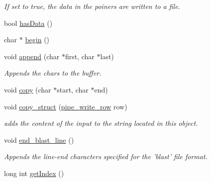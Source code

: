 \begin{DoxyCompactItemize}
\begin{DoxyCompactList}\small\item\em If set to true, the data in the poiners are written to a file. \end{DoxyCompactList}\item 
bool \hyperlink{classpipe__write__row_ab4f03f6fbd3c95567d43f5c170716a31}{hasData} ()
\item 
char $\ast$ \hyperlink{classpipe__write__row_aefc4cc6d2b93b89d8977a278fffe1204}{begin} ()
\item 
\hypertarget{classpipe__write__row_a4c65d2d25a7ce96fded64c1d74be2ce5}{
void \hyperlink{classpipe__write__row_a4c65d2d25a7ce96fded64c1d74be2ce5}{append} (char $\ast$first, char $\ast$last)}
\label{classpipe__write__row_a4c65d2d25a7ce96fded64c1d74be2ce5}

\begin{DoxyCompactList}\small\item\em Appends the chars to the buffer. \end{DoxyCompactList}\item 
void \hyperlink{classpipe__write__row_aab2549715725f68ec74e1ba5070c3fa7}{copy} (char $\ast$start, char $\ast$end)
\item 
\hypertarget{classpipe__write__row_adb2169a7991280908ea3bb1a4accdc82}{
void \hyperlink{classpipe__write__row_adb2169a7991280908ea3bb1a4accdc82}{copy\_\-struct} (\hyperlink{classpipe__write__row}{pipe\_\-write\_\-row} row)}
\label{classpipe__write__row_adb2169a7991280908ea3bb1a4accdc82}

\begin{DoxyCompactList}\small\item\em adds the content of the input to the string located in this object. \end{DoxyCompactList}\item 
\hypertarget{classpipe__write__row_af8627cdcd7884319a57a898a59404586}{
void \hyperlink{classpipe__write__row_af8627cdcd7884319a57a898a59404586}{end\_\-blast\_\-line} ()}
\label{classpipe__write__row_af8627cdcd7884319a57a898a59404586}

\begin{DoxyCompactList}\small\item\em Appends the line-\/end characters specified for the 'blast' file format. \end{DoxyCompactList}\item 
\hypertarget{classpipe__write__row_a91f2a5b891309c7a6a902945f4990486}{
long int \hyperlink{classpipe__write__row_a91f2a5b891309c7a6a902945f4990486}{getIndex} ()}
\label{classpipe__write__row_a91f2a5b891309c7a6a902945f4990486}


\end{DoxyCompactItemize}

